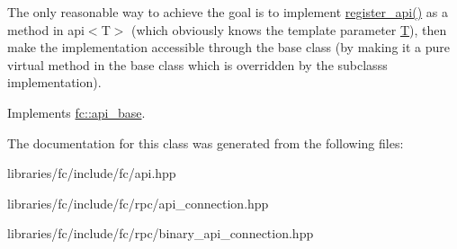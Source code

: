 The only reasonable way to achieve the goal is to implement \mbox{\hyperlink{classfc_1_1api_a0fc48f47c158c42785ac9a7b21bf8788}{register\+\_\+api()}} as a method in api$<$\+T$>$ (which obviously knows the template parameter \mbox{\hyperlink{struct_t}{T}}), then make the implementation accessible through the base class (by making it a pure virtual method in the base class which is overridden by the subclass\textquotesingle{}s implementation). 

Implements \mbox{\hyperlink{classfc_1_1api__base}{fc\+::api\+\_\+base}}.



The documentation for this class was generated from the following files\+:\begin{DoxyCompactItemize}
\item 
libraries/fc/include/fc/api.\+hpp\item 
libraries/fc/include/fc/rpc/api\+\_\+connection.\+hpp\item 
libraries/fc/include/fc/rpc/binary\+\_\+api\+\_\+connection.\+hpp\end{DoxyCompactItemize}
